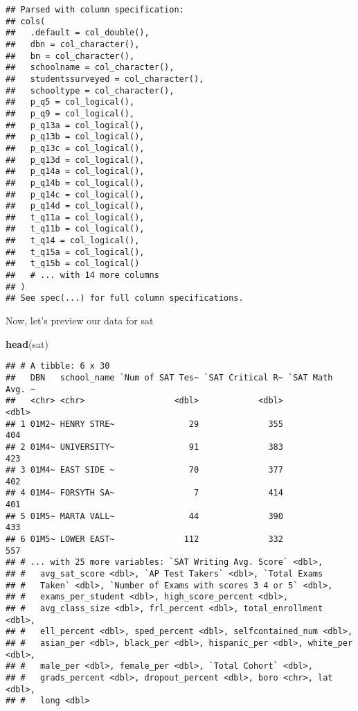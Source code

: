 \documentclass[]{article}
\newenvironment{Shaded}{\begin{snugshade}}{\end{snugshade}}
\newcommand{\KeywordTok}[1]{\textcolor[rgb]{0.13,0.29,0.53}{\textbf{#1}}}
\newcommand{\NormalTok}[1]{#1}
\begin{document}
\begin{verbatim}
## Parsed with column specification:
## cols(
##   .default = col_double(),
##   dbn = col_character(),
##   bn = col_character(),
##   schoolname = col_character(),
##   studentssurveyed = col_character(),
##   schooltype = col_character(),
##   p_q5 = col_logical(),
##   p_q9 = col_logical(),
##   p_q13a = col_logical(),
##   p_q13b = col_logical(),
##   p_q13c = col_logical(),
##   p_q13d = col_logical(),
##   p_q14a = col_logical(),
##   p_q14b = col_logical(),
##   p_q14c = col_logical(),
##   p_q14d = col_logical(),
##   t_q11a = col_logical(),
##   t_q11b = col_logical(),
##   t_q14 = col_logical(),
##   t_q15a = col_logical(),
##   t_q15b = col_logical()
##   # ... with 14 more columns
## )
## See spec(...) for full column specifications.
\end{verbatim}

Now, let's preview our data for sat

\begin{Shaded}
\begin{Highlighting}[]
\KeywordTok{head}\NormalTok{(sat)}
\end{Highlighting}
\end{Shaded}

\begin{verbatim}
## # A tibble: 6 x 30
##   DBN   school_name `Num of SAT Tes~ `SAT Critical R~ `SAT Math Avg. ~
##   <chr> <chr>                  <dbl>            <dbl>            <dbl>
## 1 01M2~ HENRY STRE~               29              355              404
## 2 01M4~ UNIVERSITY~               91              383              423
## 3 01M4~ EAST SIDE ~               70              377              402
## 4 01M4~ FORSYTH SA~                7              414              401
## 5 01M5~ MARTA VALL~               44              390              433
## 6 01M5~ LOWER EAST~              112              332              557
## # ... with 25 more variables: `SAT Writing Avg. Score` <dbl>,
## #   avg_sat_score <dbl>, `AP Test Takers` <dbl>, `Total Exams
## #   Taken` <dbl>, `Number of Exams with scores 3 4 or 5` <dbl>,
## #   exams_per_student <dbl>, high_score_percent <dbl>,
## #   avg_class_size <dbl>, frl_percent <dbl>, total_enrollment <dbl>,
## #   ell_percent <dbl>, sped_percent <dbl>, selfcontained_num <dbl>,
## #   asian_per <dbl>, black_per <dbl>, hispanic_per <dbl>, white_per <dbl>,
## #   male_per <dbl>, female_per <dbl>, `Total Cohort` <dbl>,
## #   grads_percent <dbl>, dropout_percent <dbl>, boro <chr>, lat <dbl>,
## #   long <dbl>
\end{verbatim}
\end{document}
